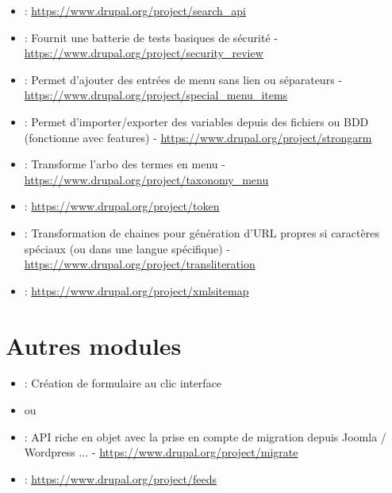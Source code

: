 \documentclass[a4paper,11pt,french]{rtdsphinxmanual}
\begin{document}
\begin{itemize}
\item {} 
 : \href{https://www.drupal.org/project/search\_api}{https://www.drupal.org/project/search\_api}

\item {} 
 : Fournit une batterie de tests basiques de sécurité - \href{https://www.drupal.org/project/security\_review}{https://www.drupal.org/project/security\_review}

\item {} 
 : Permet d'ajouter des entrées de menu sans lien ou séparateurs - \href{https://www.drupal.org/project/special\_menu\_items}{https://www.drupal.org/project/special\_menu\_items}

\item {} 
 : Permet d'importer/exporter des variables depuis des fichiers ou BDD (fonctionne avec features) - \href{https://www.drupal.org/project/strongarm}{https://www.drupal.org/project/strongarm}

\item {} 
 : Transforme l'arbo des termes en menu  - \href{https://www.drupal.org/project/taxonomy\_menu}{https://www.drupal.org/project/taxonomy\_menu}

\item {} 
 : \href{https://www.drupal.org/project/token}{https://www.drupal.org/project/token}

\item {} 
 : Transformation de chaines pour génération d'URL propres si caractères spéciaux (ou dans une langue spécifique) - \href{https://www.drupal.org/project/transliteration}{https://www.drupal.org/project/transliteration}

\item {} 
 : \href{https://www.drupal.org/project/xmlsitemap}{https://www.drupal.org/project/xmlsitemap}

\end{itemize}


\section{Autres modules}
\label{modules:autres-modules}\begin{itemize}
\item {} 
 : Création de formulaire au clic interface

\item {} 
 ou 

\item {} 
 : API riche en objet avec la prise en compte de migration depuis Joomla / Wordpress ... - \href{https://www.drupal.org/project/migrate}{https://www.drupal.org/project/migrate}

\item {} 
 : \href{https://www.drupal.org/project/feeds}{https://www.drupal.org/project/feeds}

\end{itemize}
\end{document}
